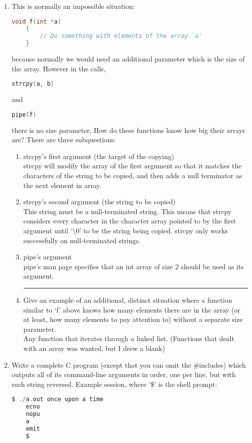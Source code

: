 \documentclass[11pt]{article}
\begin{document}
\begin{enumerate}
		\newpage
		\item This is normally an impossible situation:
			\begin{lstlisting}[language=c]
	void f(int *a)
	{
		// Do something with elements of the array `a'
	}\end{lstlisting}
			because normally we would need an additional parameter which is the size of the array. However in the calls, \begin{lstlisting}[language=c]
	strcpy(a, b)\end{lstlisting}
and \begin{lstlisting}[language=c]
	pipe(f)\end{lstlisting}
			there is no size parameter, How do these functions know how big their arrays are? There are three subquestions:
				\begin{enumerate}
					\item strcpy's first argument (the target of the copying) \\
						strcpy will modify the array of the first argument so that it matches the characters of the string to be copied, and then adds a null terminator as the next element in array.
					\item strcpy's second argument (the string to be copied)\\
						This string must be a null-terminated string. This means that strcpy considers every character in the character array pointed to by the first argument until `\textbackslash 0' to be the string being copied. strcpy only works successfully on null-terminated strings.
					\item pipe's argument\\
						pipe's man page specifies that an int array of size 2 should be used as its argument.\\
					\rule{6cm}{1pt}
					\item Give an example of an additional, distinct situation where a function similar to `f' above knows how many elements there are in the array (or at least, how many elements to pay attention to) without a separate size parameter.\\
						Any function that iterates through a linked list. (Functions that dealt with an array was wanted,  but I drew a blank)
				\end{enumerate}
			
			\newpage
			\item Write a complete C program (except that you can omit the \#includes) which outputs all of its command-line arguments in order, one per line, but with each string reversed. Example session, where '\$' is the shell prompt: \begin{lstlisting}[language=c]
	$ ./a.out once upon a time
	ecno
	nopu
	a
	emit
	$\end{lstlisting}
				
				

\end{enumerate}
\end{document}
